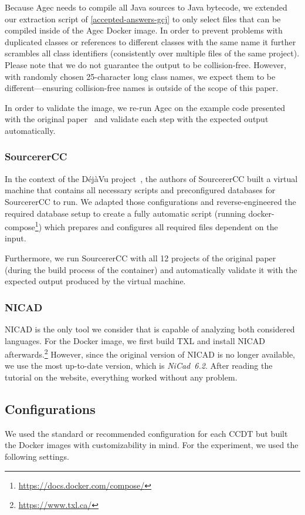 \documentclass[10pt,journal,compsoc]{IEEEtran}
\def\todo#1{\textcolor{brown!80!yellow!70!black!90!red}{[\textsc{todo}: \textsf{#1}]}}
\newcommand*\urldate[2]{\url{#1}\;\textsuperscript{\color{gray}\DTMdate{#2}}}
\newcommand*\footurl[3][]{\footnote{#1\urldate{#2}{#3}}}
\begin{document}
Because Agec needs to compile all Java sources to Java bytecode, we extended our extraction script of \cref{accepted-answers-gcj} to only select files that can be compiled inside of the Agec Docker image. In order to prevent problems with duplicated classes or references to different classes with the same name it further scrambles all class identifiers (consistently over multiple files of the same project).
Please note that we do not guarantee the output to be collision-free. However, with randomly chosen 25-character long class names, we expect them to be different---ensuring collision-free names is outside of the scope of this paper.

In order to validate the image, we re-run Agec on the example code presented with the original paper~\cite{6613854} and validate each step with the expected output automatically.

\subsubsection{SourcererCC}
In the context of the DéjàVu project~\cite{10.1145/3133908}, the authors of SourcererCC built a virtual machine that contains all necessary scripts and preconfigured databases for SourcererCC to run.
We adapted those configurations and reverse-engineered the required database setup to create a fully automatic script (running docker-compose\footurl{https://docs.docker.com/compose/}{2022-03-01}) which prepares and configures all required files dependent on the input.

Furthermore, we run SourcererCC with all 12 projects of the original paper (during the build process of the container) and automatically validate it with the expected output produced by the virtual machine.

\subsubsection{NICAD}
NICAD is the only tool we consider that is capable of analyzing both considered languages.
For the Docker image, we first build TXL and install NICAD afterwards.\footurl{https://www.txl.ca/}{2022-03-01}
However, since the original version of NICAD is no longer available, we use the most up-to-date version, which is \mbox{\textit{NiCad~6.2}}. After reading the tutorial on the website, everything worked without any problem.

\subsection{Configurations}\label{configuration}
We used the standard or recommended configuration for each CCDT but built the Docker images with customizability in mind. For the experiment, we used the following settings.
\end{document}
